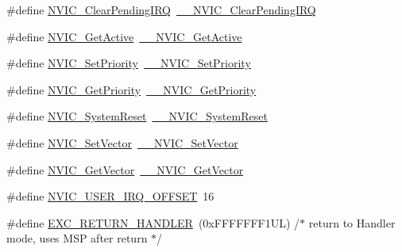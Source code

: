 \begin{DoxyCompactItemize}
\item 
\#define \hyperlink{group___c_m_s_i_s___core___n_v_i_c_functions_ga590cf113000a079b1f0ea3dcd5b5316c}{N\+V\+I\+C\+\_\+\+Clear\+Pending\+I\+RQ}~\hyperlink{group___c_m_s_i_s___core___n_v_i_c_functions_ga562a86dbdf14827d0fee8fdafb04d191}{\+\_\+\+\_\+\+N\+V\+I\+C\+\_\+\+Clear\+Pending\+I\+RQ}
\item 
\#define \hyperlink{group___c_m_s_i_s___core___n_v_i_c_functions_ga58ad3f352f832235ab3b192ff4745320}{N\+V\+I\+C\+\_\+\+Get\+Active}~\hyperlink{group___c_m_s_i_s___core___n_v_i_c_functions_gaa2837003c28c45abf193fe5e8d27f593}{\+\_\+\+\_\+\+N\+V\+I\+C\+\_\+\+Get\+Active}
\item 
\#define \hyperlink{group___c_m_s_i_s___core___n_v_i_c_functions_gae0e9d0e2f7b6133828c71b57d4941c35}{N\+V\+I\+C\+\_\+\+Set\+Priority}~\hyperlink{group___c_m_s_i_s___core___n_v_i_c_functions_ga505338e23563a9c074910fb14e7d45fd}{\+\_\+\+\_\+\+N\+V\+I\+C\+\_\+\+Set\+Priority}
\item 
\#define \hyperlink{group___c_m_s_i_s___core___n_v_i_c_functions_gaf59b9d0a791d2157abb319753953eceb}{N\+V\+I\+C\+\_\+\+Get\+Priority}~\hyperlink{group___c_m_s_i_s___core___n_v_i_c_functions_gaeb9dc99c8e7700668813144261b0bc73}{\+\_\+\+\_\+\+N\+V\+I\+C\+\_\+\+Get\+Priority}
\item 
\#define \hyperlink{group___c_m_s_i_s___core___n_v_i_c_functions_ga6aa0367d3642575610476bf0366f0c48}{N\+V\+I\+C\+\_\+\+System\+Reset}~\hyperlink{group___c_m_s_i_s___core___n_v_i_c_functions_ga0d9aa2d30fa54b41eb780c16e35b676c}{\+\_\+\+\_\+\+N\+V\+I\+C\+\_\+\+System\+Reset}
\item 
\#define \hyperlink{group___c_m_s_i_s___core___n_v_i_c_functions_ga804af63bb4c4c317387897431814775d}{N\+V\+I\+C\+\_\+\+Set\+Vector}~\hyperlink{group___c_m_s_i_s___core___n_v_i_c_functions_ga0df355460bc1783d58f9d72ee4884208}{\+\_\+\+\_\+\+N\+V\+I\+C\+\_\+\+Set\+Vector}
\item 
\#define \hyperlink{group___c_m_s_i_s___core___n_v_i_c_functions_ga955eb1c33a3dcc62af11a8385e8c0fc8}{N\+V\+I\+C\+\_\+\+Get\+Vector}~\hyperlink{group___c_m_s_i_s___core___n_v_i_c_functions_ga44b665d2afb708121d9b10c76ff00ee5}{\+\_\+\+\_\+\+N\+V\+I\+C\+\_\+\+Get\+Vector}
\item 
\#define \hyperlink{group___c_m_s_i_s___core___n_v_i_c_functions_ga8045d905a5ca57437d8e6f71ffcb6df5}{N\+V\+I\+C\+\_\+\+U\+S\+E\+R\+\_\+\+I\+R\+Q\+\_\+\+O\+F\+F\+S\+ET}~16
\item 
\#define \hyperlink{group___c_m_s_i_s___core___n_v_i_c_functions_gaa6fa2b10f756385433e08522d9e4632f}{E\+X\+C\+\_\+\+R\+E\+T\+U\+R\+N\+\_\+\+H\+A\+N\+D\+L\+ER}~(0x\+F\+F\+F\+F\+F\+F\+F1\+U\+L)     /$\ast$ return to Handler mode, uses M\+S\+P after return                               $\ast$/

\end{DoxyCompactItemize}
